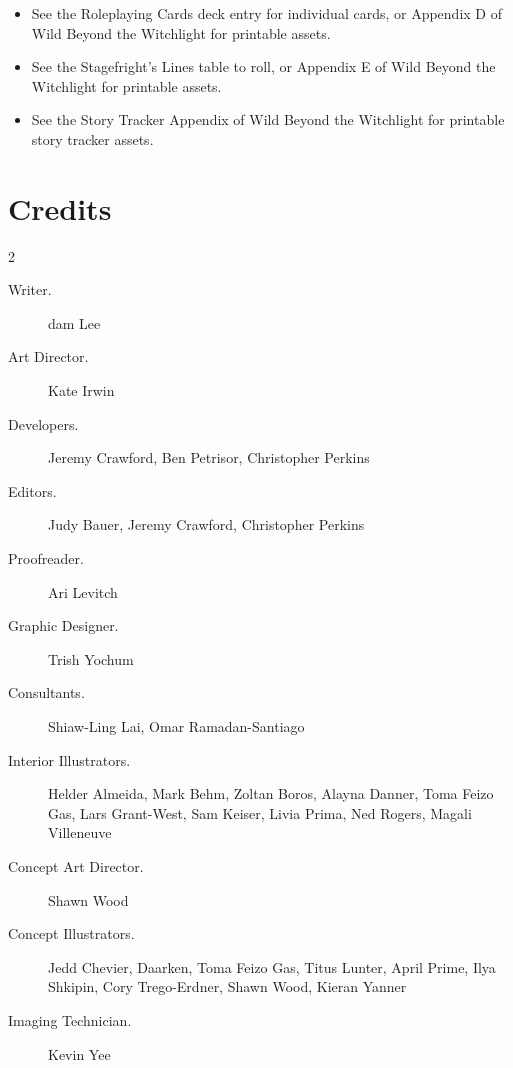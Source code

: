 \documentclass[10pt,a4paper,twoside,bg=print,twocolumn,openany,nodeprecatedcode]{dndbook}
\begin{document}
\begin{itemize}
\item See the Roleplaying Cards deck entry for individual cards, or Appendix D of Wild Beyond the Witchlight for printable assets.
\item See the Stagefright's Lines table to roll, or Appendix E of Wild Beyond the Witchlight for printable assets.
\item See the Story Tracker Appendix of Wild Beyond the Witchlight for printable story tracker assets.
\end{itemize}

\chapter{Credits}

\begin{description}
\begin{multicols}{2}

\begin{description}
\item[Writer.]
dam Lee


\item[Art Director.]
Kate Irwin

\item[Developers.]
Jeremy Crawford, Ben Petrisor, Christopher Perkins

\item[Editors.]
Judy Bauer, Jeremy Crawford, Christopher Perkins

\item[Proofreader.]
Ari Levitch

\item[Graphic Designer.]
Trish Yochum

\item[Consultants.]
Shiaw-Ling Lai, Omar Ramadan-Santiago

\item[Interior Illustrators.]
Helder Almeida, Mark Behm, Zoltan Boros, Alayna Danner, Toma Feizo Gas, Lars Grant-West, Sam Keiser, Livia Prima, Ned Rogers, Magali Villeneuve

\item[Concept Art Director.]
Shawn Wood

\item[Concept Illustrators.]
Jedd Chevier, Daarken, Toma Feizo Gas, Titus Lunter, April Prime, Ilya Shkipin, Cory Trego-Erdner, Shawn Wood, Kieran Yanner

\item[Imaging Technician.]
Kevin Yee


\end{description}
\end{multicols}
\end{description}
\end{document}
